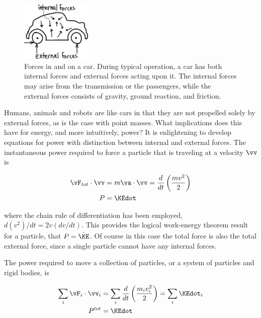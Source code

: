 \begin{figure}[h]		%
\begin{centering}
\includegraphics[width=0.3\textwidth]{Figures/CarForces}\par
\end{centering}
\caption[Diagram: Forces in and on a car]{Forces in and on a car. During typical operation, a car has both internal forces and external forces acting upon it. The internal forces may arise from the transmission or the passengers, while the external forces consists of gravity, ground reaction, and friction.}
\label{fig:CarForces}
\end{figure}
%

Humans, animals and robots are like cars in that they are not propelled solely by external forces, as is the case with point masses. What implications does this have for energy, and more intuitively, power? It is enlightening to develop equations for power with distinction between internal and external forces. The instantaneous power required to force a particle that is traveling at a velocity $\vv$ is

\begin{align}
\vF_{tot} \cdot \vv  &=  m\va \cdot \vv = \frac{d}{dt} \left(\frac{m v^2}{2}\right) \\
 P &= \KEdot
\end{align}

where the chain rule of differentiation has been employed, $d(v^{2})/dt = 2v(dv/dt)$. This provides the logical work-energy theorem result for a particle, that $P = \dot{\KE}$. Of course in this case the total force is also the total external force, since a single particle cannot have any internal forces.

The power required to move a collection of particles, or a system of particles and rigid bodies, is

\begin{align}
 \sum_{i} \vF_{i} \cdot \vv_{i}  &=  \sum_{i} \frac{d}{dt}\left(\frac{m_{i} v_{i}^{2}}{2}\right) = \sum_{i} \KEdot_{i}\\
P^{tot} &= \KEdot
\label{eq:PowerCollectionOfParticles}
\end{align}

